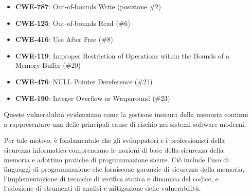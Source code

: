 \begin{itemize}
  \item \textbf{CWE-787}: Out-of-bounds Write (posizione \#2)

  \item \textbf{CWE-125}: Out-of-bounds Read (\#6)

  \item \textbf{CWE-416}: Use After Free (\#8)

  \item \textbf{CWE-119}: Improper Restriction of Operations within the Bounds of
    a Memory Buffer (\#20)

  \item \textbf{CWE-476}: NULL Pointer Dereference (\#21)

  \item \textbf{CWE-190}: Integer Overflow or Wraparound (\#23)
\end{itemize}

Queste vulnerabilità evidenziano come la gestione insicura della memoria continui
a rappresentare una delle principali cause di rischio nei sistemi software moderni.

\vspace{0.5em}

Per tale motivo, è fondamentale che gli sviluppatori e i professionisti della sicurezza
informatica comprendano le nozioni di base della sicurezza della memoria e adottino
pratiche di programmazione sicure. Ciò include l'uso di linguaggi di
programmazione che forniscono garanzie di sicurezza della memoria, l'implementazione
di tecniche di verifica statica e dinamica del codice, e l'adozione di strumenti
di analisi e mitigazione delle vulnerabilità.